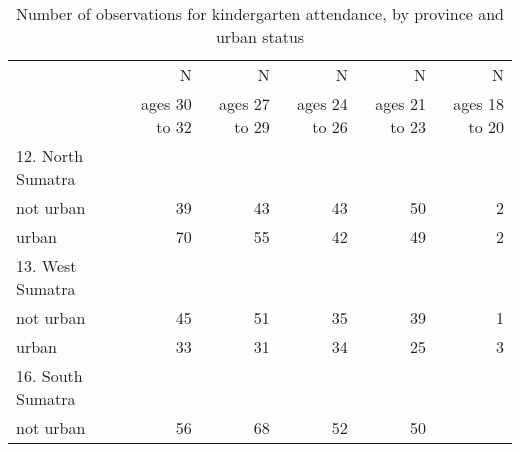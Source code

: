 \begin{table}[!h]
\caption{Number of observations for kindergarten attendance, by province and urban status}
\centering
\begin{tabular}{llllll}
\cline{1-6}
\multicolumn{1}{c}{} &
  \multicolumn{1}{|r}{N} &
  \multicolumn{1}{r}{N} &
  \multicolumn{1}{r}{N} &
  \multicolumn{1}{r}{N} &
  \multicolumn{1}{r}{N} \\
\multicolumn{1}{c}{} &
  \multicolumn{1}{|r}{ages 30 to 32} &
  \multicolumn{1}{r}{ages 27 to 29} &
  \multicolumn{1}{r}{ages 24 to 26} &
  \multicolumn{1}{r}{ages 21 to 23} &
  \multicolumn{1}{r}{ages 18 to 20} \\
\cline{1-6}
\multicolumn{1}{l}{12. North Sumatra} &
  \multicolumn{1}{|r}{} &
  \multicolumn{1}{r}{} &
  \multicolumn{1}{r}{} &
  \multicolumn{1}{r}{} &
  \multicolumn{1}{r}{} \\
\multicolumn{1}{l}{\hspace{1em}not urban} &
  \multicolumn{1}{|r}{39} &
  \multicolumn{1}{r}{43} &
  \multicolumn{1}{r}{43} &
  \multicolumn{1}{r}{50} &
  \multicolumn{1}{r}{2} \\
\multicolumn{1}{l}{\hspace{1em}urban} &
  \multicolumn{1}{|r}{70} &
  \multicolumn{1}{r}{55} &
  \multicolumn{1}{r}{42} &
  \multicolumn{1}{r}{49} &
  \multicolumn{1}{r}{2} \\
\multicolumn{1}{l}{13. West Sumatra} &
  \multicolumn{1}{|r}{} &
  \multicolumn{1}{r}{} &
  \multicolumn{1}{r}{} &
  \multicolumn{1}{r}{} &
  \multicolumn{1}{r}{} \\
\multicolumn{1}{l}{\hspace{1em}not urban} &
  \multicolumn{1}{|r}{45} &
  \multicolumn{1}{r}{51} &
  \multicolumn{1}{r}{35} &
  \multicolumn{1}{r}{39} &
  \multicolumn{1}{r}{1} \\
\multicolumn{1}{l}{\hspace{1em}urban} &
  \multicolumn{1}{|r}{33} &
  \multicolumn{1}{r}{31} &
  \multicolumn{1}{r}{34} &
  \multicolumn{1}{r}{25} &
  \multicolumn{1}{r}{3} \\
\multicolumn{1}{l}{16. South Sumatra} &
  \multicolumn{1}{|r}{} &
  \multicolumn{1}{r}{} &
  \multicolumn{1}{r}{} &
  \multicolumn{1}{r}{} &
  \multicolumn{1}{r}{} \\
\multicolumn{1}{l}{\hspace{1em}not urban} &
  \multicolumn{1}{|r}{56} &
  \multicolumn{1}{r}{68} &
  \multicolumn{1}{r}{52} &
  \multicolumn{1}{r}{50} &
  \multicolumn{1}{r}{} \\

\end{tabular}
\end{table}
